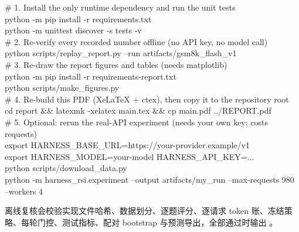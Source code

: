 \documentclass[a4paper,zihao=5,linespread=1.38]{ctexart}
\newcommand{\code}[1]{\texttt{\detokenize{#1}}}
\begin{document}
\begin{tcolorbox}[enhanced, colback=accentwash!60!white, colframe=hair, boxrule=0.6pt, arc=2pt, left=8pt, right=8pt, top=4pt, bottom=4pt,
                  fontupper=\ttfamily\small]
\# 1. Install the only runtime dependency and run the unit tests\\
python -m pip install -r requirements.txt\\
python -m unittest discover -s tests -v\\[4pt]
\# 2. Re-verify every recorded number offline (no API key, no model call)\\
python scripts/replay\_report.py --run artifacts/gsm8k\_flash\_v1\\[4pt]
\# 3. Re-draw the report figures and tables (needs matplotlib)\\
python -m pip install -r requirements-report.txt\\
python scripts/make\_figures.py\\[4pt]
\# 4. Re-build this PDF (XeLaTeX + ctex), then copy it to the repository root\\
cd report \&\& latexmk -xelatex main.tex \&\& cp main.pdf ../REPORT.pdf\\[4pt]
\# 5. Optional: rerun the real-API experiment (needs your own key; costs requests)\\
export HARNESS\_BASE\_URL=https://your-provider.example/v1\\
export HARNESS\_MODEL=your-model HARNESS\_API\_KEY=...\\
python scripts/download\_data.py\\
python -m harness\_rsi.experiment --output artifacts/my\_run --max-requests 980 --workers 4
\end{tcolorbox}

离线复核会校验实现文件哈希、数据划分、逐题评分、逐请求 token 账、冻结策略、每轮门控、测试指标、配对 bootstrap 与预测导出，全部通过时输出 \code{verified_offline}。
\end{document}
